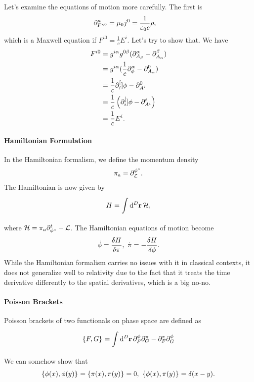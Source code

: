 Let's examine the equations of motion more carefully. The first is
\begin{align*}
	\partial^{\kappa}_{F^{\kappa 0}} &= \mu_{0}j^{0} = \frac{1}{\varepsilon_{0}c}\rho,
\end{align*}
which is a Maxwell equation if $F^{i 0} = \frac{1}{c}E^{i}$. Let's try to show that. We have
\begin{align*}
	F^{i0} &= g^{i\alpha}g^{0\beta}(\partial^{\alpha}_{A_{\beta}} - \partial^{\beta}_{A_{\alpha}}) \\
	       &= g^{i\alpha}(\frac{1}{c}\partial^{\alpha}_{\phi} - \partial^{0}_{A_{\alpha}}) \\
	       &= \frac{1}{c}\partial^{[}_{i}]{}{\phi} - \partial^{0}_{A^{i}} \\
	       &= \frac{1}{c}\left(\partial^{[}_{i}]{}{\phi} - \partial^{t}_{A^{i}}\right) \\
	       &= \frac{1}{c}E^{i}.
\end{align*}

\paragraph{Hamiltonian Formulation}
In the Hamiltonian formalism, we define the momentum density
\begin{align*}
	\pi_{a} = \partial^{\phi^{a}}_{\mathcal{L}}.
\end{align*}
The Hamiltonian is now given by
\begin{align*}
	H = \int\limits_{}^{}\dd[D]{\vb{r}}\mathcal{H},
\end{align*}
where $\mathcal{H} = \pi_{a}\partial^{t}_{\phi^{a}} - \mathcal{L}$. The Hamiltonian equations of motion become
\begin{align*}
	\dot{\phi} = \fdv{H}{\pi},\ \dot{\pi} = -\fdv{H}{\phi}.
\end{align*}
While the Hamiltonian formalism carries no issues with it in classical contexts, it does not generalize well to relativity due to the fact that it treats the time derivative differently to the spatial derivatives, which is a big no-no.


\paragraph{Poisson Brackets}
Poisson brackets of two functionals on phase space are defined as
\begin{align*}
\left\{F, G\right\}_{} = \int\limits_{}^{}\dd[D]{\vb{r}}\partial^{\phi}_{F}\partial^{\pi}_{G} - \partial^{\pi}_{F}\partial^{\phi}_{G}
\end{align*}
We can somehow show that
\begin{align*}
\pob{\phi(x)}{\phi(y)} = \pob{\pi(x)}{\pi(y)} = 0,\ \pob{\phi(x)}{\pi(y)} = \delta(x - y).
\end{align*}


